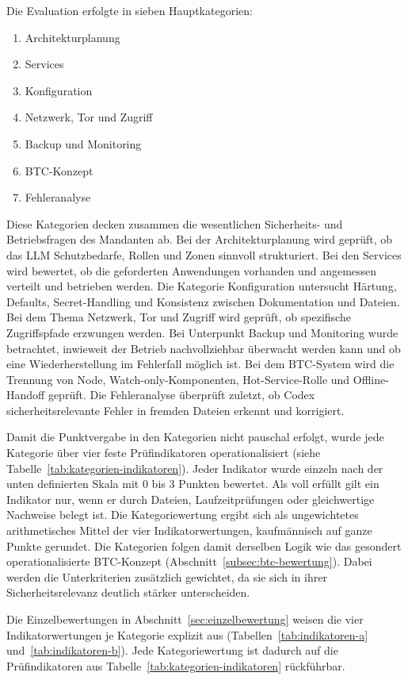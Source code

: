 Die Evaluation erfolgte in sieben Hauptkategorien:

\begin{enumerate}
\item Architekturplanung
\item Services
\item Konfiguration
\item Netzwerk, Tor und Zugriff
\item Backup und Monitoring
\item \ac{BTC}-Konzept
\item Fehleranalyse
\end{enumerate}

Diese Kategorien decken zusammen die wesentlichen Sicherheits- und Betriebsfragen des Mandanten ab. Bei der Architekturplanung wird geprüft, ob das \ac{LLM} Schutzbedarfe, Rollen und Zonen sinnvoll strukturiert. Bei den Services wird bewertet, ob die geforderten Anwendungen vorhanden und angemessen verteilt und betrieben werden. Die Kategorie Konfiguration untersucht Härtung, Defaults, Secret-Handling und Konsistenz zwischen Dokumentation und Dateien. Bei dem Thema Netzwerk, Tor und Zugriff wird geprüft, ob spezifische Zugriffspfade erzwungen werden. Bei Unterpunkt Backup und Monitoring wurde betrachtet, inwieweit der Betrieb nachvollziehbar überwacht werden kann und ob eine Wiederherstellung im Fehlerfall möglich ist. Bei dem \ac{BTC}-System wird die Trennung von Node, Watch-only-Komponenten, Hot-Service-Rolle und Offline-Handoff geprüft. Die Fehleranalyse überprüft zuletzt, ob Codex sicherheitsrelevante Fehler in fremden Dateien erkennt und korrigiert.

Damit die Punktvergabe in den Kategorien nicht pauschal erfolgt, wurde jede
Kategorie über vier feste Prüfindikatoren operationalisiert (siehe Tabelle~\ref{tab:kategorien-indikatoren}). Jeder Indikator wurde einzeln nach der unten definierten Skala mit 0 bis 3 Punkten bewertet.
Als voll erfüllt gilt ein Indikator nur, wenn er durch Dateien, Laufzeitprüfungen oder gleichwertige Nachweise belegt ist. Die Kategoriewertung ergibt sich als ungewichtetes arithmetisches Mittel der vier Indikatorwertungen, kaufmännisch auf ganze Punkte gerundet. 
Die Kategorien folgen damit derselben Logik wie das gesondert operationalisierte \ac{BTC}-Konzept (Abschnitt~\ref{subsec:btc-bewertung}). Dabei werden die Unterkriterien zusätzlich gewichtet, da sie sich in ihrer Sicherheitsrelevanz deutlich stärker unterscheiden.

Die Einzelbewertungen in Abschnitt~\ref{sec:einzelbewertung} weisen die vier Indikatorwertungen je Kategorie explizit aus (Tabellen~\ref{tab:indikatoren-a} und~\ref{tab:indikatoren-b}).
Jede Kategoriewertung ist dadurch auf die Prüfindikatoren aus
Tabelle~\ref{tab:kategorien-indikatoren} rückführbar.

